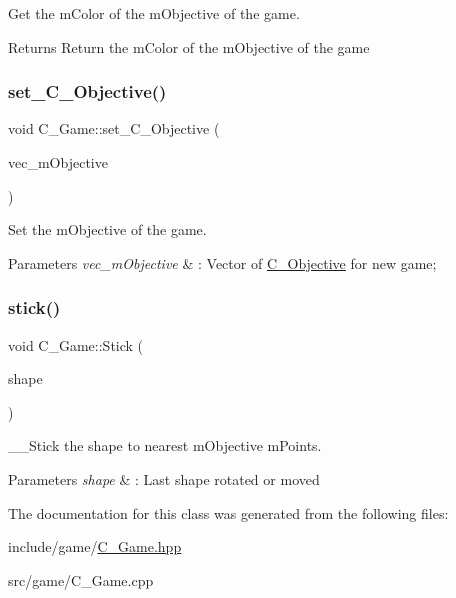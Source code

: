 Get the mColor of the mObjective of the game.

\begin{DoxyReturn}{Returns}
Return the mColor of the mObjective of the game
\end{DoxyReturn}
\mbox{\label{classGame_af8d3ef359625e4179d54f5dd956a0df5}} 
\subsubsection{\texorpdfstring{set\+\_\+\+C_Objective()}{set\_Objective()}}
{\footnotesize\ttfamily void C_Game\+::set\+\_\+\+C_Objective (\begin{DoxyParamCaption}\item[{const std\+::vector$<$ std\+::shared\+\_\+ptr$<$ \hyperlink{classShape}{A_Shape} $>$$>$ \&}]{vec\+\_\+mObjective }\end{DoxyParamCaption})}



Set the mObjective of the game.


\begin{DoxyParams}{Parameters}
{\em vec\+\_\+mObjective} & \+: Vector of \hyperlink{classObjective}{C_Objective} for new game; \\
\hline
\end{DoxyParams}
\mbox{\label{classGame_a54ea3746d3738423197219af2d508188}} 
\subsubsection{\texorpdfstring{stick()}{stick()}}
{\footnotesize\ttfamily void C_Game\+::Stick (\begin{DoxyParamCaption}\item[{const std\+::shared\+\_\+ptr$<$ \hyperlink{classShape}{A_Shape} $>$ \&}]{shape }\end{DoxyParamCaption})}



__Stick the shape to nearest mObjective mPoints.


\begin{DoxyParams}{Parameters}
{\em shape} & \+: Last shape rotated or moved \\
\hline
\end{DoxyParams}


The documentation for this class was generated from the following files\+:\begin{DoxyCompactItemize}
\item 
include/game/\hyperlink{Game_8hpp}{C_Game.\+hpp}\item
src/game/C_Game.\+cpp\end{DoxyCompactItemize}
